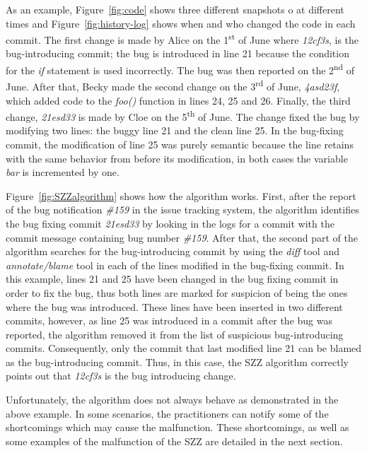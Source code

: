 \documentclass[a4paper, 12pt]{book}
\begin{document}
As an example, Figure~\ref{fig:code} shows three different snapshots o at different times  and Figure~\ref{fig:history-log} shows when and who changed the code in each commit. The first change is made by Alice on the 1\textsuperscript{st} of June where \textit{12cf3s}, is the bug-introducing commit; the bug is introduced in line 21 because the condition for the \emph{if} statement is used incorrectly. The bug was then reported on the 2\textsuperscript{nd} of June. After that, Becky made the second change on the 3\textsuperscript{rd} of June, \textit{4asd23f}, which added code to the \emph{foo()} function in lines 24, 25 and 26. Finally, the third change, \textit{21esd33} is made by Cloe on the 5\textsuperscript{th} of June. The change fixed the bug by modifying two lines: the buggy line 21 and the clean line 25. In the bug-fixing commit, the modification of line 25 was purely semantic because the line retains with the same behavior from before its modification, in both cases the variable \emph{bar} is incremented by one.

Figure~\ref{fig:SZZalgorithm} shows how the algorithm works. First, after the report of the bug notification \emph{\#159} in the issue tracking system, the algorithm identifies the bug fixing commit \textit{21esd33} by looking in the logs for a commit with the commit message containing bug number \emph{\#159}. After that, the second part of the algorithm searches for the bug-introducing commit by using the \emph{diff} tool and \emph{annotate/blame} tool in each of the lines modified in the bug-fixing commit. In this example, lines 21 and 25 have been changed in the bug fixing commit in order to fix the bug, thus both lines are marked for suspicion of being the ones where the bug was introduced. These lines have been inserted in two different commits, however, as line 25 was introduced in a commit after the bug was reported, the algorithm removed it from the list of suspicious bug-introducing commits. Consequently, only the commit that last modified line 21 can be blamed as the bug-introducing commit. Thus, in this case, the SZZ algorithm correctly points out that \textit{12cf3s} is the bug introducing change.

Unfortunately, the algorithm does not always behave as demonstrated in the above example. In some scenarios, the practitioners can notify some of the shortcomings which may cause the malfunction. These shortcomings, as well as some examples of the malfunction of the SZZ are detailed in the next section.
\end{document}
